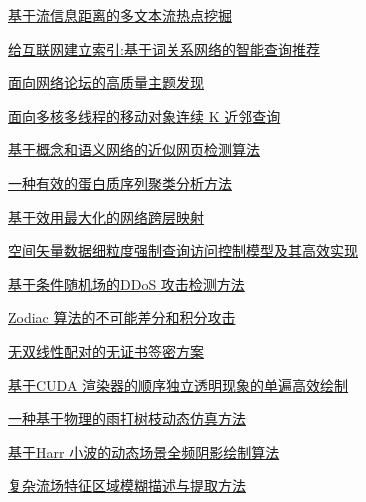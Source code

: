 \documentclass[a4paper]{article}
\begin{document}
\href{http://www.jos.org.cn/ch/reader/download_pdf.aspx?file_no=3893&year_id=2011&quarter_id=8&falg=1}{基于流信息距离的多文本流热点挖掘}

\href{http://www.jos.org.cn/ch/reader/download_pdf.aspx?file_no=3852&year_id=2011&quarter_id=8&falg=1}{给互联网建立索引:基于词关系网络的智能查询推荐}

\href{http://www.jos.org.cn/ch/reader/download_pdf.aspx?file_no=3857&year_id=2011&quarter_id=8&falg=1}{面向网络论坛的高质量主题发现}

\href{http://www.jos.org.cn/ch/reader/download_pdf.aspx?file_no=3904&year_id=2011&quarter_id=8&falg=1}{面向多核多线程的移动对象连续 K 近邻查询}

\href{http://www.jos.org.cn/ch/reader/download_pdf.aspx?file_no=3890&year_id=2011&quarter_id=8&falg=1}{基于概念和语义网络的近似网页检测算法}

\href{http://www.jos.org.cn/ch/reader/download_pdf.aspx?file_no=3848&year_id=2011&quarter_id=8&falg=1}{一种有效的蛋白质序列聚类分析方法}

\href{http://www.jos.org.cn/ch/reader/download_pdf.aspx?file_no=3894&year_id=2011&quarter_id=8&falg=1}{基于效用最大化的网络跨层映射}

\href{http://www.jos.org.cn/ch/reader/download_pdf.aspx?file_no=3868&year_id=2011&quarter_id=8&falg=1}{空间矢量数据细粒度强制查询访问控制模型及其高效实现}

\href{http://www.jos.org.cn/ch/reader/download_pdf.aspx?file_no=3960&year_id=2011&quarter_id=8&falg=1}{基于条件随机场的DDoS 攻击检测方法}

\href{http://www.jos.org.cn/ch/reader/download_pdf.aspx?file_no=3875&year_id=2011&quarter_id=8&falg=1}{Zodiac 算法的不可能差分和积分攻击}

\href{http://www.jos.org.cn/ch/reader/download_pdf.aspx?file_no=3891&year_id=2011&quarter_id=8&falg=1}{无双线性配对的无证书签密方案}

\href{http://www.jos.org.cn/ch/reader/download_pdf.aspx?file_no=3932&year_id=2011&quarter_id=8&falg=1}{基于CUDA 渲染器的顺序独立透明现象的单遍高效绘制}

\href{http://www.jos.org.cn/ch/reader/download_pdf.aspx?file_no=4022&year_id=2011&quarter_id=8&falg=1}{一种基于物理的雨打树枝动态仿真方法}

\href{http://www.jos.org.cn/ch/reader/download_pdf.aspx?file_no=3865&year_id=2011&quarter_id=8&falg=1}{基于Harr 小波的动态场景全频阴影绘制算法}

\href{http://www.jos.org.cn/ch/reader/download_pdf.aspx?file_no=3851&year_id=2011&quarter_id=8&falg=1}{复杂流场特征区域模糊描述与提取方法}
\end{document}
